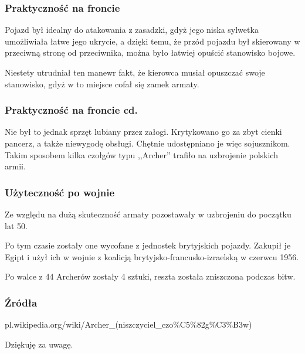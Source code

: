\documentclass[]{beamer}
\begin{document}
\begin{frame}
\frametitle{Praktyczność na froncie}
Pojazd był idealny do atakowania z zasadzki, gdyż jego niska sylwetka umożliwiała łatwe jego ukrycie, a dzięki temu, że przód pojazdu był skierowany w przeciwną stronę od przeciwnika, można było łatwiej opuścić stanowisko bojowe.

Niestety utrudniał ten manewr fakt, że kierowca musiał opuszczać swoje stanowisko, gdyż w to miejsce cofał się zamek armaty.
\end{frame}

\begin{frame}
\frametitle[toc=]{Praktyczność na froncie cd.}
Nie był to jednak sprzęt lubiany przez załogi. Krytykowano go za zbyt cienki pancerz, a także niewygodę obsługi. Chętnie udostępniano je więc sojusznikom. Takim sposobem kilka czołgów typu ,,Archer'' trafiło na uzbrojenie polskich armii.
\end{frame}

\begin{frame}
\frametitle{Użyteczność po wojnie}
Ze względu na dużą skuteczność armaty pozostawały w uzbrojeniu do początku lat 50. \pause 

Po tym czasie zostały one wycofane z jednostek brytyjskich pojazdy. Zakupił je Egipt i użył ich w wojnie z koalicją brytyjsko-francusko-izraelską w czerwcu 1956. \pause

Po walce z 44 Archerów zostały 4 sztuki, reszta została zniszczona podczas bitw.
\end{frame}

\begin{frame}
\frametitle{Źródła}
pl.wikipedia.org/wiki/Archer\_(niszczyciel\_czo\%C5\%82g\%C3\%B3w)
\end{frame}
\begin{frame}
\begin{center}
Dziękuję za uwagę.
\end{center}
\end{frame}
\end{document}
